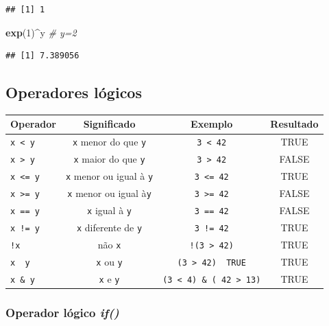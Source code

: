 \documentclass[
]{book}
\newenvironment{Shaded}{\begin{snugshade}}{\end{snugshade}}
\newcommand{\CommentTok}[1]{\textcolor[rgb]{0.56,0.35,0.01}{\textit{#1}}}
\newcommand{\DecValTok}[1]{\textcolor[rgb]{0.00,0.00,0.81}{#1}}
\newcommand{\KeywordTok}[1]{\textcolor[rgb]{0.13,0.29,0.53}{\textbf{#1}}}
\newcommand{\NormalTok}[1]{#1}
\newcommand{\OperatorTok}[1]{\textcolor[rgb]{0.81,0.36,0.00}{\textbf{#1}}}
\theoremstyle{definition}
\theoremstyle{definition}
\theoremstyle{definition}
\theoremstyle{remark}
\begin{document}
\begin{verbatim}
## [1] 1
\end{verbatim}

\begin{Shaded}
\begin{Highlighting}[]
\KeywordTok{exp}\NormalTok{(}\DecValTok{1}\NormalTok{)}\OperatorTok{^}\NormalTok{y     }\CommentTok{# y=2}
\end{Highlighting}
\end{Shaded}

\begin{verbatim}
## [1] 7.389056
\end{verbatim}

\hypertarget{operadores-luxf3gicos}{%
\subsection{Operadores lógicos}\label{operadores-luxf3gicos}}

\begin{longtable}[]{@{}lccc@{}}
\toprule
Operador & Significado & Exemplo & Resultado\tabularnewline
\midrule
\endhead
\texttt{x\ \textless{}\ y} & \texttt{x} menor do que \texttt{y} & \texttt{3\ \textless{}\ 42} & TRUE\tabularnewline
\texttt{x\ \textgreater{}\ y} & \texttt{x} maior do que \texttt{y} & \texttt{3\ \textgreater{}\ 42} & FALSE\tabularnewline
\texttt{x\ \textless{}=\ y} & \texttt{x} menor ou igual à \texttt{y} & \texttt{3\ \textless{}=\ 42} & TRUE\tabularnewline
\texttt{x\ \textgreater{}=\ y} & \texttt{x} menor ou igual à\texttt{y} & \texttt{3\ \textgreater{}=\ 42} & FALSE\tabularnewline
\texttt{x\ ==\ y} & \texttt{x} igual à \texttt{y} & \texttt{3\ ==\ 42} & FALSE\tabularnewline
\texttt{x\ !=\ y} & \texttt{x} diferente de \texttt{y} & \texttt{3\ !=\ 42} & TRUE\tabularnewline
\texttt{!x} & não \texttt{x} & \texttt{!(3\ \textgreater{}\ 42)} & TRUE\tabularnewline
\texttt{x\ \textbar{}\ y} & \texttt{x} ou \texttt{y} & \texttt{(3\ \textgreater{}\ 42)\ \textbar{}\ TRUE} & TRUE\tabularnewline
\texttt{x\ \&\ y} & \texttt{x} e \texttt{y} & \texttt{(3\ \textless{}\ 4)\ \&\ (\ 42\ \textgreater{}\ 13)} & TRUE\tabularnewline
\bottomrule
\end{longtable}

\hypertarget{operador-luxf3gico-if}{%
\subsubsection{\texorpdfstring{Operador lógico \emph{if()}}{Operador lógico if()}}\label{operador-luxf3gico-if}}
\end{document}
